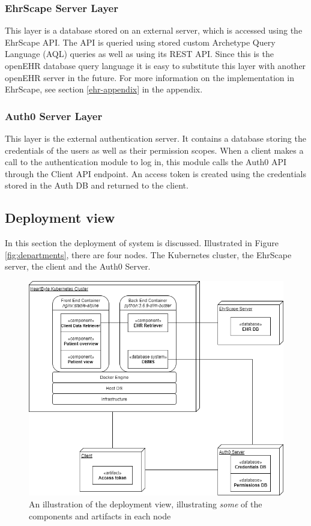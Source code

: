 \documentclass{article}
\begin{document}
\subsubsection{EhrScape Server Layer}
This layer is a database stored on an external server, which is accessed using the EhrScape API. The API is queried using stored custom Archetype Query Language (AQL) queries as well as using its REST API. Since this is the openEHR database query language it is easy to substitute this layer with another openEHR server in the future. For more information on the implementation in EhrScape, see section \ref{ehr-appendix} in the appendix.

\subsubsection{Auth0 Server Layer}
This layer is the external authentication server. It contains a database storing the credentials of the users as well as their permission scopes. When a client makes a call to the authentication module to log in, this module calls the Auth0 API through the Client API endpoint. An access token is created using the credentials stored in the Auth DB and returned to the client.

\subsection{Deployment view}
In this section the deployment of system is discussed. Illustrated in Figure \ref{fig:departments}, there are four nodes. The Kubernetes cluster, the EhrScape server, the client and the Auth0 Server.

\begin{figure}[h]
    \centering
    \includegraphics[scale = 0.45]{deployment-view}
    \caption{An illustration of the deployment view, illustrating \emph{some} of the components and artifacts in each node}
    \label{fig:deployment-view}
\end{figure}
\end{document}
